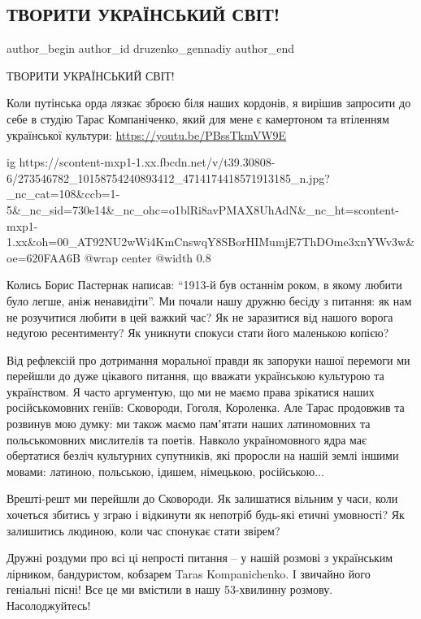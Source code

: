  
 
 
 
 
 
\subsection{ТВОРИТИ УКРАЇНСЬКИЙ СВІТ!}
\label{sec:08_02_2022.fb.druzenko_gennadiy.1.tvoryty_ukrainskij_svit}
 
\ifcmt
 author_begin
   author_id druzenko_gennadiy
 author_end
\fi

ТВОРИТИ УКРАЇНСЬКИЙ СВІТ!

Коли путінська орда лязкає зброєю біля наших кордонів, я вирішив запросити до
себе в студію Тарас Компаніченко, який для мене є камертоном та втіленням
української культури: \url{https://youtu.be/PBssTkmVW9E}

\ifcmt
  ig https://scontent-mxp1-1.xx.fbcdn.net/v/t39.30808-6/273546782_10158754240893412_4714174418571913185_n.jpg?_nc_cat=108&ccb=1-5&_nc_sid=730e14&_nc_ohc=o1blRi8avPMAX8UhAdN&_nc_ht=scontent-mxp1-1.xx&oh=00_AT92NU2wWi4KmCnswqY8SBorHIMumjE7ThDOme3xnYWv3w&oe=620FAA6B
  @wrap center
  @width 0.8
\fi

Колись Борис Пастернак написав: \enquote{1913-й був останнім роком, в якому любити було
легше, аніж ненавидіти}. Ми почали нашу дружню бесіду з питання: як нам не
розучитися любити в цей важкий час? Як не заразитися від нашого ворога недугою
ресентименту? Як уникнути спокуси стати його маленькою копією?

Від рефлексій про дотримання моральної правди як запоруки нашої перемоги ми
перейшли до дуже цікавого питання, що вважати українською культурою та
українством. Я часто аргументую, що ми не маємо права зрікатися наших
російськомовних геніїв: Сковороди, Гоголя, Короленка. Але Тарас продовжив та
розвинув мою думку: ми також маємо памʼятати наших латиномовних та
польськомовних мислителів та поетів. Навколо україномовного ядра має обертатися
безліч культурних супутників, які проросли на нашій землі іншими мовами:
латиною, польською, ідишем, німецькою, російською...

Врешті-решт ми перейшли до Сковороди. Як залишатися вільним у часи, коли
хочеться збитись у зграю і відкинути як непотріб будь-які етичні умовності? Як
залишитись людиною, коли час спонукає стати звірем?

Дружні роздуми про всі ці непрості питання – у нашій розмові з українським
лірником, бандуристом, кобзарем Taras Kompanichenko. І звичайно його геніальні
пісні! Все це ми вмістили в нашу 53-хвилинну розмову. Насолоджуйтесь!
